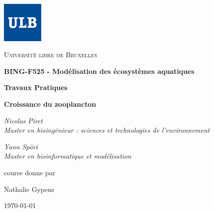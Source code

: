\documentclass[12pt,a4paper]{article}
\begin{document}
{
\raggedleft
\includegraphics[width=0.15\textwidth]{ulbnorm.jpg}
\par\vspace{-1.8cm}
\centering
{\scshape\LARGE Université libre de Bruxelles \par}
\vspace{2.4cm}
{\Huge\bfseries BING-F525 - Modélisation des écosystèmes aquatiques\par}
\vspace{1.2cm}
{\Large\bfseries Travaux Pratiques\par}
\vspace{1.0cm}
{\LARGE\bfseries Croissance du zooplancton\par}
\vspace{1.5cm}
{\Large\itshape Nicolas Piret\\Master en bioingénieur : sciences et technologies de l'environnement\par}
\vspace{0.5cm}
{\Large\itshape Yann Spöri\\Master en bioinformatique et modélisation\par}
\vfill
course donne par\par
Nathalie Gypens%
\vfill
\begin{center}{\large \today}\end{center}
}
\newpage
{}

\tableofcontents
\newpage


\FloatBarrier

\FloatBarrier
%

\FloatBarrier
\end{document}
